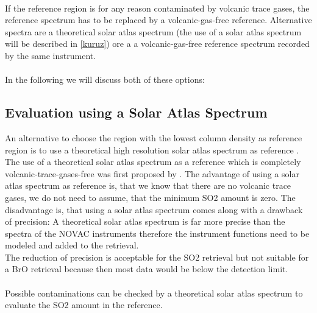 \documentclass  [
  paper    = a4,
  BCOR     = 10mm,
  twoside,
  fontsize = 12pt,
  fleqn,
  toc      = bibnumbered,
  toc      = listofnumbered,
  numbers  = noendperiod,
  headings = normal,
  listof   = leveldown,
  version  = 3.03
]                                       {scrreprt}
\begin{document}
	\\
	If the reference region is for any reason
	contaminated by volcanic trace gases, the reference spectrum has to be
	replaced by a volcanic-gas-free reference. Alternative spectra are a
	theoretical solar atlas spectrum (the use of a solar atlas spectrum will be described in \cref{kuruz}) ore a a volcanic-gas-free reference
	spectrum recorded by the same instrument.\\ 
	\\
	In the following we will discuss both of these options:
	\subsection*{Evaluation using a Solar Atlas Spectrum \label{kuruz}}
	An alternative to choose the region with the lowest column density as reference region is to use a theoretical high resolution solar atlas spectrum as reference \cite{chance2010improved}.
	The use of a theoretical solar atlas spectrum as a reference which is completely volcanic-trace-gases-free was first proposed by \cite{lubcke2014bro}.
	The advantage of using a solar atlas spectrum as reference is, that we know that there are no volcanic trace gases, we do not need to assume, that the minimum SO2 amount is zero. The disadvantage is, that using a solar atlas spectrum comes along with a drawback of precision: A theoretical solar atlas spectrum is far more precise than the spectra of the NOVAC instruments therefore the instrument functions need to be modeled and added to the retrieval.\\ 
	The reduction of precision is acceptable for the
	SO2 retrieval but not suitable for a BrO retrieval because then most data would be below the detection limit.\\
%
\\
%
	Possible contaminations can be checked
	by a theoretical solar atlas spectrum to evaluate the SO2 amount in the reference.
\end{document}
